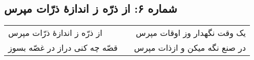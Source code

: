 \begin{center}
\section*{شماره ۶: از ذرّه ز اندازۀ ذرّات مپرس}
\label{sec:006}
\begin{longtable}{l p{0.5cm} r}
از ذرّه ز اندازهٔ ذرّات مپرس
&&
یک وقت نگهدار وز اوقات مپرس
\\
قصّه چه کنی دراز در غصّه بسوز
&&
در صنع نگه میکن و ازذات مپرس
\\
\end{longtable}
\end{center}
